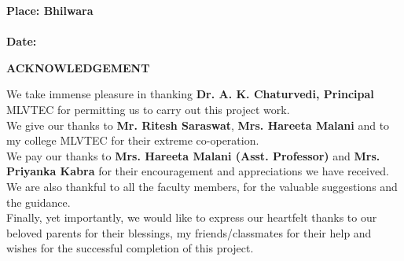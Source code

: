 \documentclass[twoside,a4paper,16pt]{book}
\begin{document}
{{ {\bf Place: Bhilwara }\\\\
{\bf Date: } 
}




\newpage
\begin{center}
	\huge{\bf ACKNOWLEDGEMENT} 
\end{center}
\vspace{1.5cm}
 
{\large We take immense pleasure in thanking {\bf Dr. A. K. Chaturvedi, Principal} MLVTEC for permitting us to carry out this project work.\\
We give our thanks to {\bf Mr. Ritesh Saraswat}, {\bf Mrs. Hareeta Malani} and to my college MLVTEC for their extreme co-operation.\\
We pay our thanks to {\bf Mrs. Hareeta Malani (Asst. Professor)} and {\bf Mrs. Priyanka Kabra} for their encouragement and appreciations we have received.\\
We are also thankful to all the faculty members, for the valuable suggestions and the guidance.\\
Finally, yet importantly, we would like to express our heartfelt thanks to our beloved parents for their blessings, my friends/classmates for their help and wishes for the successful completion of this project.\\


}}
\end{document}
